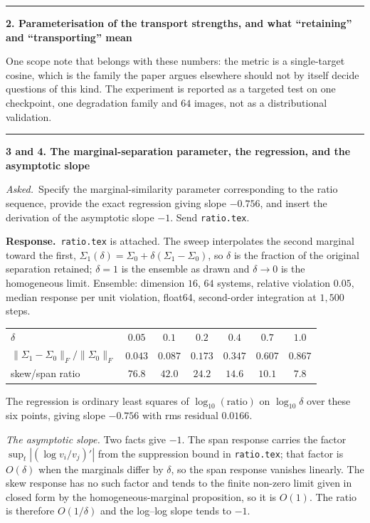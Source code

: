 \documentclass[11pt]{article}
\newenvironment{item12}[1]{%
  \par\medskip\noindent\rule{\textwidth}{0.7pt}\par\nobreak\smallskip
  \noindent\textbf{\large #1}\par\nobreak\smallskip
}{\par\medskip}
\newcommand{\ask}[1]{\noindent\emph{Asked.}\ #1\par\smallskip}
\newcommand{\resp}{\noindent\textbf{Response.}\ }
\begin{document}
\begin{item12}{2. Parameterisation of the transport strengths, and what ``retaining'' and
``transporting'' mean}
One scope note that belongs with these numbers: the metric is a single-target cosine, which is
the family the paper argues elsewhere should not by itself decide questions of this kind. The
experiment is reported as a targeted test on one checkpoint, one degradation family and $64$
images, not as a distributional validation.
\end{item12}

\begin{item12}{3 and 4. The marginal-separation parameter, the regression, and the asymptotic
slope}
\ask{Specify the marginal-similarity parameter corresponding to the ratio sequence, provide the
exact regression giving slope $-0.756$, and insert the derivation of the asymptotic slope $-1$.
Send \texttt{ratio.tex}.}

\resp \texttt{ratio.tex} is attached. The sweep interpolates the second marginal toward the
first, $\Sigma_1(\delta)=\Sigma_0+\delta(\Sigma_1-\Sigma_0)$, so $\delta$ is the fraction of the
original separation retained; $\delta=1$ is the ensemble as drawn and $\delta\to0$ is the
homogeneous limit. Ensemble: dimension $16$, $64$ systems, relative violation $0.05$, median
response per unit violation, float64, second-order integration at $1{,}500$ steps.

\begin{center}
\small
\begin{tabular}{@{}lcccccc@{}}
\toprule
$\delta$ & $0.05$ & $0.1$ & $0.2$ & $0.4$ & $0.7$ & $1.0$\\
$\|\Sigma_1-\Sigma_0\|_F/\|\Sigma_0\|_F$ & $0.043$ & $0.087$ & $0.173$ & $0.347$ & $0.607$ &
$0.867$\\
skew/span ratio & $76.8$ & $42.0$ & $24.2$ & $14.6$ & $10.1$ & $7.8$\\
\bottomrule
\end{tabular}
\end{center}

The regression is ordinary least squares of $\log_{10}(\text{ratio})$ on $\log_{10}\delta$ over
these six points, giving slope $-0.756$ with rms residual $0.0166$.

\emph{The asymptotic slope.} Two facts give $-1$. The span response carries the factor
$\sup_t|(\log v_i/v_j)'|$ from the suppression bound in \texttt{ratio.tex}; that factor is
$O(\delta)$ when the marginals differ by $\delta$, so the span response vanishes linearly. The
skew response has no such factor and tends to the finite non-zero limit given in closed form by
the homogeneous-marginal proposition, so it is $O(1)$. The ratio is therefore $O(1/\delta)$ and
the log--log slope tends to $-1$.


\end{item12}
\end{document}

